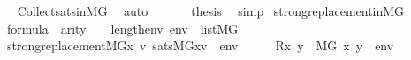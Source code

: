 \begin{isabellebody}
\ \ \ \ \isamarkupfalse%
\ Collect{\isacharunderscore}{\kern0pt}sats{\isacharunderscore}{\kern0pt}in{\isacharunderscore}{\kern0pt}MG\ \isamarkupfalse%
\ auto\isanewline
\ \ \isamarkupfalse%
\isanewline
\ \ \isamarkupfalse%
\ {\isacharquery}{\kern0pt}thesis\ \isamarkupfalse%
\ simp\isanewline
{}\isamarkupfalse%
%
\endisatagproof
{\isafoldproof}%
%
\isadelimproof
\isanewline
%
\endisadelimproof
\isanewline
{}\isamarkupfalse%
\ strong{\isacharunderscore}{\kern0pt}replacement{\isacharunderscore}{\kern0pt}in{\isacharunderscore}{\kern0pt}MG{\isacharcolon}{\kern0pt}\isanewline
\ \ \isanewline
\ \ \ \ {\isachardoublequoteopen}{\isasymphi}{\isasymin}formula{\isachardoublequoteclose}\ \ {\isachardoublequoteopen}arity{\isacharparenleft}{\kern0pt}{\isasymphi}{\isacharparenright}{\kern0pt}\ {\isasymle}\ {}\ {\isacharhash}{\kern0pt}{\isacharplus}{\kern0pt}\ length{\isacharparenleft}{\kern0pt}env{\isacharparenright}{\kern0pt}{\isachardoublequoteclose}\ {\isachardoublequoteopen}env\ {\isasymin}\ list{\isacharparenleft}{\kern0pt}M{\isacharbrackleft}{\kern0pt}G{\isacharbrackright}{\kern0pt}{\isacharparenright}{\kern0pt}{\isachardoublequoteclose}\isanewline
\ \ \isanewline
\ \ \ \ {\isachardoublequoteopen}strong{\isacharunderscore}{\kern0pt}replacement{\isacharparenleft}{\kern0pt}{\isacharhash}{\kern0pt}{\isacharhash}{\kern0pt}M{\isacharbrackleft}{\kern0pt}G{\isacharbrackright}{\kern0pt}{\isacharcomma}{\kern0pt}{\isasymlambda}x\ v{\isachardot}{\kern0pt}\ sats{\isacharparenleft}{\kern0pt}M{\isacharbrackleft}{\kern0pt}G{\isacharbrackright}{\kern0pt}{\isacharcomma}{\kern0pt}{\isasymphi}{\isacharcomma}{\kern0pt}{\isacharbrackleft}{\kern0pt}x{\isacharcomma}{\kern0pt}v{\isacharbrackright}{\kern0pt}\ {\isacharat}{\kern0pt}\ env{\isacharparenright}{\kern0pt}{\isacharparenright}{\kern0pt}{\isachardoublequoteclose}\isanewline
%
\isadelimproof
%
\endisadelimproof
%
\isatagproof
{}\isamarkupfalse%
\ {\isacharminus}{\kern0pt}\isanewline
\ \ \isamarkupfalse%
\ {\isacharquery}{\kern0pt}R{\isacharequal}{\kern0pt}{\isachardoublequoteopen}{\isasymlambda}x\ y\ {\isachardot}{\kern0pt}\ M{\isacharbrackleft}{\kern0pt}G{\isacharbrackright}{\kern0pt}{\isacharcomma}{\kern0pt}\ {\isacharbrackleft}{\kern0pt}x{\isacharcomma}{\kern0pt}\ y{\isacharbrackright}{\kern0pt}\ {\isacharat}{\kern0pt}\ env\ {\isasymTurnstile}\ {\isasymphi}{\isachardoublequoteclose}\isanewline
\ \ \isacommand{{\isacharbraceleft}{\kern0pt}}\isamarkupfalse%

\end{isabellebody}
